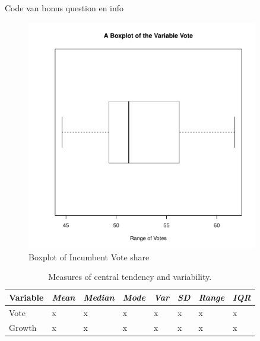 \documentclass[a4paper,12pt]{article} %
\begin{document}
\begin{enumerate}
Code van bonus question en info 
















 \begin{figure}[H] %
    \centering %
    \includegraphics[width=0.9\textwidth]{box1.pdf} 
    \caption{Boxplot of Incumbent Vote share} %
  \end{figure}



\begin{table}[H]
\centering
\begin{tabular}{llllllll}
\multicolumn{1}{c}{\textbf{Variable}} & \multicolumn{1}{c}{\textit{Mean}} & \multicolumn{1}{c}{\textit{Median}} & \textit{Mode} & \textit{Var} & \textit{SD} & \textit{Range} & \textit{IQR} \\ \hline
Vote                                  & x                                 & x                                   & x             & x            & x           & x              & x            \\
Growth                                & x                                 & x                                   & x             & x            & x           & x              & x            
\end{tabular}
\caption{Measures of central tendency and variability.}
\label{my-label}
\end{table}

\end{enumerate}
\end{document}

